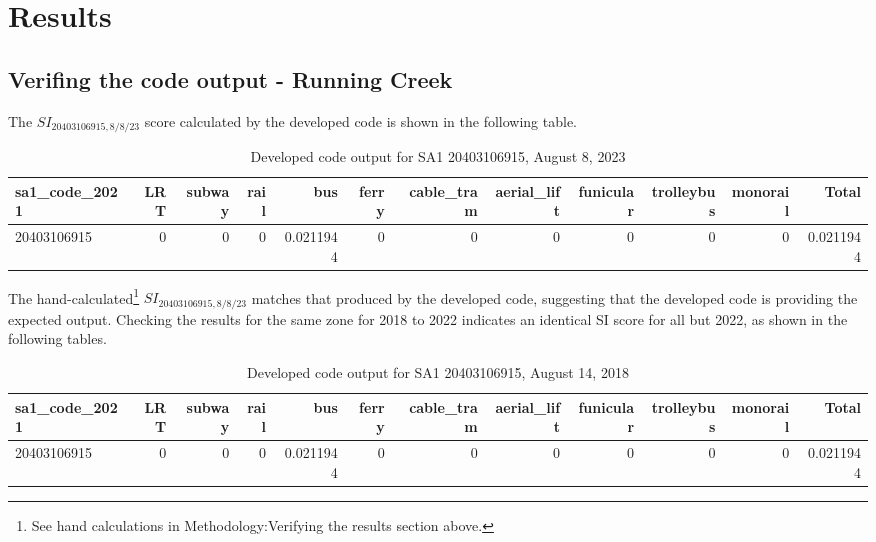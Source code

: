 \documentclass[]{tufte-book}
\begin{document}
\hypertarget{results}{%
\chapter{Results}\label{results}}

\hypertarget{verifing-the-code-output---running-creek}{%
\section{Verifing the code output - Running
Creek}\label{verifing-the-code-output---running-creek}}

The \(SI_{20403106915, 8/8/23}\) score calculated by the developed code
is shown in the following table.\\

\begin{table}

\caption{\label{tab:Running_Creek_SI_calc_SA1_2021}Developed code output for SA1 20403106915, August 8, 2023}
\centering
\begin{tabular}[t]{l|r|r|r|r|r|r|r|r|r|r|r}
\hline
sa1\_code\_2021 & LRT & subway & rail & bus & ferry & cable\_tram & aerial\_lift & funicular & trolleybus & monorail & Total\\
\hline
20403106915 & 0 & 0 & 0 & 0.0211944 & 0 & 0 & 0 & 0 & 0 & 0 & 0.0211944\\
\hline
\end{tabular}
\end{table}

The hand-calculated\footnote{See hand calculations in
  Methodology:Verifying the results section above.}
\(SI_{20403106915, 8/8/23}\) matches that produced by the developed
code, suggesting that the developed code is providing the expected
output. Checking the results for the same zone for 2018 to 2022
indicates an identical SI score for all but 2022, as shown in the
following tables.

\begin{table}

\caption{\label{tab:Running_Creek_SI_calc_SA1_2018_2022}Developed code output for SA1 20403106915, August 14, 2018}
\centering
\begin{tabular}[t]{l|r|r|r|r|r|r|r|r|r|r|r}
\hline
sa1\_code\_2021 & LRT & subway & rail & bus & ferry & cable\_tram & aerial\_lift & funicular & trolleybus & monorail & Total\\
\hline
20403106915 & 0 & 0 & 0 & 0.0211944 & 0 & 0 & 0 & 0 & 0 & 0 & 0.0211944\\
\hline
\end{tabular}
\end{table}
\end{document}
